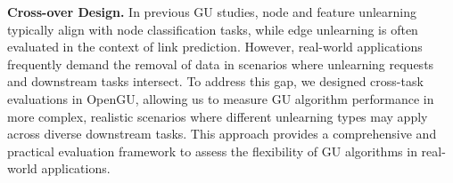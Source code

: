  \textbf{Cross-over Design.}
In previous GU studies, node and feature unlearning typically align with node classification tasks, while edge unlearning is often evaluated in the context of link prediction. However, real-world applications frequently demand the removal of data in scenarios where unlearning requests and downstream tasks intersect. 
To address this gap, we designed cross-task evaluations in OpenGU, allowing us to measure GU algorithm performance in more complex, realistic scenarios where different unlearning types may apply across diverse downstream tasks. This approach provides a comprehensive and practical evaluation framework to assess the flexibility of GU algorithms in real-world applications.

